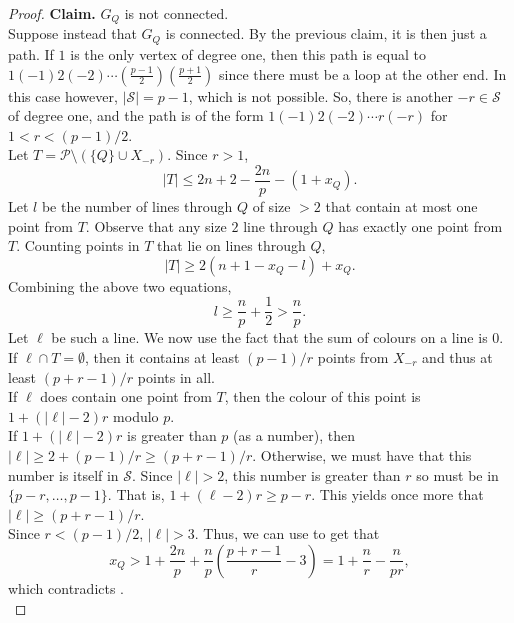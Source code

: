 \begin{proof}
		\textbf{Claim.} $G_Q$ is not connected.\\
		Suppose instead that $G_Q$ is connected. By the previous claim, it is then just a path. If $1$ is the only vertex of degree one, then this path is equal to $1(-1)2(-2)\cdots (\frac{p-1}{2})(\frac{p+1}{2})$ since there must be a loop at the other end. In this case however, $|\mathcal{S}| = p-1$, which is not possible. So, there is another $-r \in \mathcal{S}$ of degree one, and the path is of the form $1 (-1) 2 (-2) \cdots r (-r)$ for $1 < r < (p-1)/2$.\\
		Let $T = \mathcal{P} \setminus (\{Q\} \cup X_{-r})$. Since $r > 1$,
		\[ |T| \le 2n + 2 - \frac{2n}{p} - (1 + x_Q). \]
		Let $l$ be the number of lines through $Q$ of size $>2$ that contain at most one point from $T$. Observe that any size $2$ line through $Q$ has exactly one point from $T$. Counting points in $T$ that lie on lines through $Q$,
		\[ |T| \ge 2 (n+1 - x_Q - l) + x_Q. \]
		Combining the above two equations,
		\[ l \ge \frac{n}{p} + \frac{1}{2} > \frac{n}{p}. \]
		Let $\ell$ be such a line. We now use the fact that the sum of colours on a line is $0$. \\
		If $\ell \cap T = \emptyset$, then it contains at least $(p-1)/r$ points from $X_{-r}$ and thus at least $(p+r-1)/r$ points in all. \\
		If $\ell$ does contain one point from $T$, then the colour of this point is $1 + (|\ell|-2)r$ modulo $p$. \\
		If $1 + (|\ell|-2)r$ is greater than $p$ (as a number), then $|\ell| \ge 2 + (p-1)/r \ge (p+r-1)/r$. Otherwise, we must have that this number is itself in $\mathcal{S}$. Since $|\ell| > 2$, this number is greater than $r$ so must be in $\{p-r,\ldots,p-1\}$. That is, $1 + (\ell-2)r \ge p-r$. This yields once more that $|\ell| \ge (p+r-1)/r$.\\
		Since $r < (p-1)/2$, $|\ell| > 3$. Thus, we can use  to get that
		\[ x_Q > 1 + \frac{2n}{p} + \frac{n}{p} \left( \frac{p+r-1}{r} - 3 \right) = 1 + \frac{n}{r} - \frac{n}{pr}, \]
		which contradicts . \qedwhite \\


\end{proof}

